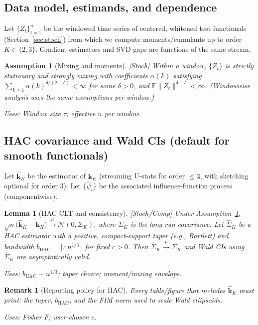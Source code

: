 \documentclass[10pt]{article}
\newcommand{\uses}[1]{\par\smallskip\noindent\textit{Uses: }#1\par\smallskip}
\newtheorem{assumption}{Assumption}
\newtheorem{lemma}{Lemma}
\newtheorem{remark}{Remark}
\begin{document}
\setcounter{lemma}{12}
\setcounter{proposition}{2}

\subsection{Data model, estimands, and dependence}\label{subsec:stats-model}

Let $\{Z_t\}_{t=1}^n$ be the windowed time series of centered, whitened test functionals (Section~\ref{sec:stoch}) from which we compute moments/cumulants up to order $K\in\{2,3\}$. Gradient estimators and SVD gaps are functions of the same stream.

\begin{assumption}[Mixing and moments]\label{ass:mixing}
\emph{[\textup{Stoch}]}
Within a window, $\{Z_t\}$ is strictly stationary and \emph{strongly mixing} with coefficients $\alpha(k)$ satisfying $\sum_{k\ge1}\alpha(k)^{\delta/(2+\delta)}<\infty$ for some $\delta>0$, and $\mathbb E\|Z_t\|^{4+\delta}<\infty$. (Windowwise analysis uses the same assumptions per window.)
\uses{Window size $\tau$; effective $n$ per window.}
\end{assumption}

\subsection{HAC covariance and Wald CIs (default for smooth functionals)}\label{subsec:hac}

Let $\widehat{\mathbf k}_K$ be the estimator of $\mathbf k_K$ (streaming U-stats for order $\le3$, with sketching optional for order 3).
Let $\{\widehat\psi_t\}$ be the associated influence-function process (componentwise).

\begin{lemma}[HAC CLT and consistency]\label{lem:hac}
\emph{[\textup{Stoch/Comp}]}
Under Assumption~\ref{ass:mixing},
\(
\sqrt{n}\big(\widehat{\mathbf k}_K-\mathbf k_K\big)\xrightarrow{d}\mathcal N(0,\Sigma_K)
\),
where $\Sigma_K$ is the long-run covariance.
Let $\widehat\Sigma_K$ be a HAC estimator with a positive, compact-support taper (e.g., Bartlett) and bandwidth
$b_{\mathrm{HAC}}=\lfloor c\,n^{1/3}\rfloor$ for fixed $c>0$.
Then $\widehat\Sigma_K\xrightarrow{p}\Sigma_K$ and Wald CIs using $\widehat\Sigma_K$ are asymptotically valid.
\uses{$b_{\mathrm{HAC}}\sim n^{1/3}$; taper choice; moment/mixing envelope.}
\end{lemma}

\begin{remark}[Reporting policy for HAC]\label{rem:hac-report}
Every table/figure that includes $\widehat{\mathbf k}_K$ must print: the taper, $b_{\mathrm{HAC}}$, and the FIM norm used to scale Wald ellipsoids.
\uses{Fisher $F$; user-chosen $c$.}
\end{remark}
\end{document}
